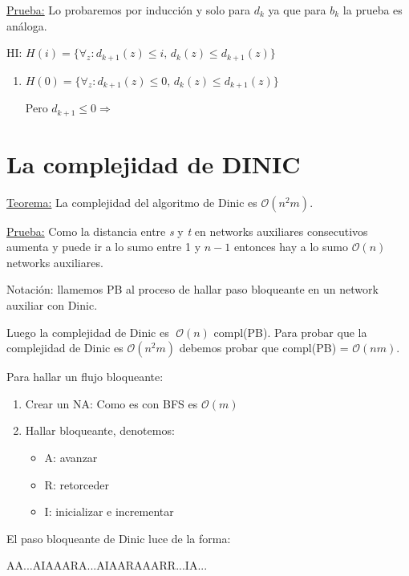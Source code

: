 \documentclass[12pt,a4paper]{report}
\begin{document}
		\underline{Prueba:} Lo probaremos por inducción y solo para $d_{k}$ ya que para $b_{k}$ la prueba es análoga.
		
		\begin{center}
			HI: $H(i) = \lbrace\forall_{z}: d_{k+1}(z) \leq \textit{i}, \, d_{k}(z) \leq d_{k+1}(z)  \rbrace$
		\end{center}
		
		\begin{enumerate}
			\item $H(0) = \lbrace\forall_{z}: d_{k+1}(z) \leq 0, \, d_{k}(z) \leq d_{k+1}(z)  \rbrace$
			
			Pero $d_{k+1} \leq 0 \Rightarrow $
		\end{enumerate}
	
	\section{La complejidad de DINIC}

		\underline{Teorema:} La complejidad del algoritmo de Dinic es $\mathcal{O}(n^{2}m)$.
		
		\underline{Prueba:} Como la distancia entre \textit{s} y \textit{t} en networks auxiliares consecutivos aumenta y puede ir a lo sumo entre 1 y $n-1$ entonces hay a lo sumo $\mathcal{O}(n)$ networks auxiliares.
		
		Notación: llamemos PB al proceso de hallar paso bloqueante en un network auxiliar con Dinic.

		Luego la complejidad de Dinic es $ \; \mathcal{O}(n)$ compl(PB). Para probar que la complejidad de Dinic es $\mathcal{O}(n^{2}m)$ debemos probar que compl(PB) = $\mathcal{O}(nm)$.

		Para hallar un flujo bloqueante:
		\begin{enumerate}
			\item Crear un NA: Como es con BFS es $\mathcal{O}(m)$
			\item Hallar bloqueante, denotemos:
				\begin{itemize}
					\item A: avanzar
					\item R: retorceder
					\item I: inicializar e incrementar
				\end{itemize}
		\end{enumerate}
		
		El paso bloqueante de Dinic luce de la forma:
		\begin{center}
			AA...AIAAARA...AIAARAAARR...IA...
		\end{center}
		
\end{document}
